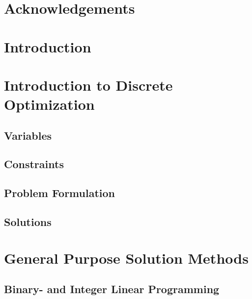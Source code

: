 \documentclass[a4paper,11pt]{article}
\begin{document}


\thispagestyle{empty}
\section*{Acknowledgements}

\thispagestyle{empty}

\newpage
\thispagestyle{empty}
\tableofcontents
\thispagestyle{empty}

\newpage
\setcounter{page}{1}
\section{Introduction}
 
 \newpage
 
\section{Introduction to Discrete Optimization}
  
  \subsection{Variables} 
  \subsection{Constraints}
  \subsection{Problem Formulation} %
  
  \subsection{Solutions}
  
  
\newpage  
\section{General Purpose Solution Methods}  
  
  \subsection{Binary- and Integer Linear Programming} %
  
  
\end{document}
